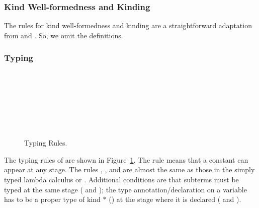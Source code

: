 \subsubsection{Kind Well-formedness and Kinding}

The rules for kind well-formedness and kinding are a straightforward adaptation
from \LLF and \LTP. So, we omit the definitions.

\subsubsection{Typing}
\label{sec:typing}

\begin{figure}[tbp]
  \begin{center}
     \hfil
     \\[2mm]
     \\[2mm]
     \\[2mm]
     \\[2mm]
     \andalso
     \\[2mm]
     \\[2mm]
     \andalso
    \caption{Typing Rules.}
    \label{fig:typing-rules}
  \end{center}
\end{figure}

The typing rules of \LMD are shown in Figure~\ref{fig:typing-rules}.
The rule \TConst{} means that a constant can appear at any stage.
The rules \TVar, \TAbs, and \TApp{} are almost the same as those in the simply typed
lambda calculus or \LLF.  Additional conditions are that subterms must be
typed at the same stage (\TAbs{} and \TApp); the type
annotation/declaration on a variable has to be a proper type of kind
$*$ (\TAbs) at the stage where it is declared (\TVar{} and \TAbs).

